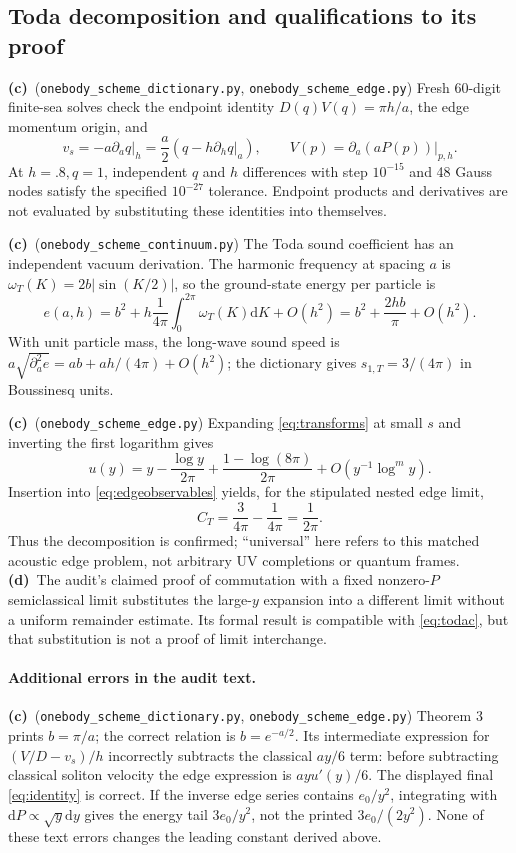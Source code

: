 \documentclass[11pt,a4paper]{article}
\newcommand{\Lc}{\textbf{(c)}\ }
\newcommand{\Ld}{\textbf{(d)}\ }
\newcommand{\dd}{\mathrm d}
\newcommand{\ccheck}{\texttt{onebody\_\allowbreak scheme\_\allowbreak continuum.py}}
\newcommand{\dcheck}{\texttt{onebody\_\allowbreak scheme\_\allowbreak dictionary.py}}
\newcommand{\echeck}{\texttt{onebody\_\allowbreak scheme\_\allowbreak edge.py}}
\begin{document}
\subsection{Toda decomposition and qualifications to its proof}
\Lc (\dcheck, \echeck) Fresh 60-digit finite-sea solves check the
endpoint identity $D(q)V(q)=\pi h/a$, the edge momentum origin, and
\begin{equation}\label{eq:thermo}
 v_s=-a\partial_aq\big|_h
 =\frac a2(q-h\partial_hq\big|_a),\qquad
 V(p)=\partial_a(aP(p))\big|_{p,h}.
\end{equation}
At $h=.8,q=1$, independent $q$ and $h$ differences with step $10^{-15}$
and 48 Gauss nodes satisfy the specified $10^{-27}$ tolerance. Endpoint
products and derivatives are not evaluated by substituting these identities
into themselves.

\Lc (\ccheck) The Toda sound coefficient has an independent vacuum
derivation. The harmonic frequency at spacing $a$ is
$\omega_T(K)=2b|\sin(K/2)|$, so the ground-state energy per particle is
\begin{equation}\label{eq:todavac}
 e(a,h)=b^2+h\frac1{4\pi}\int_0^{2\pi}\omega_T(K)\dd K+O(h^2)
       =b^2+\frac{2hb}{\pi}+O(h^2).
\end{equation}
With unit particle mass, the long-wave sound speed is
$a\sqrt{\partial_a^2 e}=ab+ah/(4\pi)+O(h^2)$; the dictionary gives
$s_{1,T}=3/(4\pi)$ in Boussinesq units.

\Lc (\echeck) Expanding \eqref{eq:transforms} at small $s$ and inverting
the first logarithm gives
\begin{equation}\label{eq:edgelog}
 u(y)=y-\frac{\log y}{2\pi}
       +\frac{1-\log(8\pi)}{2\pi}+O(y^{-1}\log^m y).
\end{equation}
Insertion into \eqref{eq:edgeobservables} yields, for the stipulated nested
edge limit,
\begin{equation}\label{eq:todac}
 C_T=\frac3{4\pi}-\frac1{4\pi}=\frac1{2\pi}.
\end{equation}
Thus the decomposition is confirmed; ``universal'' here refers to this
matched acoustic edge problem, not arbitrary UV completions or quantum
frames. \Ld The audit's claimed proof of commutation with a fixed
nonzero-$P$ semiclassical limit substitutes the large-$y$ expansion into a
different limit without a uniform remainder estimate. Its formal result is
compatible with \eqref{eq:todac}, but that substitution is not a proof of
limit interchange.

\paragraph{Additional errors in the audit text.}
\Lc (\dcheck, \echeck) Theorem 3 prints $b=\pi/a$; the correct relation
is $b=e^{-a/2}$. Its intermediate expression for $(V/D-v_s)/h$ incorrectly
subtracts the classical $ay/6$ term: before subtracting classical soliton
velocity the edge expression is $ay u'(y)/6$. The displayed final
\eqref{eq:identity} is correct. If the inverse edge series contains
$e_0/y^2$, integrating with $\dd P\propto\sqrt y\dd y$ gives the energy
tail $3e_0/y^2$, not the printed $3e_0/(2y^2)$. None of these text errors
changes the leading constant derived above.
\end{document}
